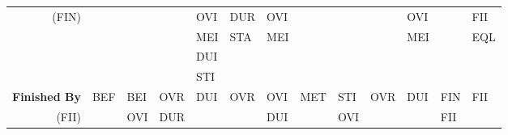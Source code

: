 \documentclass[11pt]{report}
\newenvironment{vvarmargin}[2]
{
  \begin{list}{}
  {
    \setlength{\topsep}{0pt}
    \setlength{\leftmargin}{0pt}
    \setlength{\rightmargin}{0pt}
    \setlength{\listparindent}{\parindent}
    \setlength{\itemindent}{\parindent}
    \setlength{\parsep}{0pt plus 1pt}
    \addtolength{\leftmargin}{#1}\addtolength{\rightmargin}{#2}
  }
  \item
}
{
  \end{list}
}
\begin{document}
\begin{table}[p]
\begin{vvarmargin}{-4cm}{-4cm}
\begin{center}
\begin{tabular}[t]{|r|l|l|l|l|l|l|l|l|l|l|l|l|}
                (FIN)                   &                         &                         &                         & OVI                     & DUR                     & OVI                     &                         &                         &                         & OVI                     &                         & FII                     \\
                                        &                         &                         &                         & MEI                     & STA                     & MEI                     &                         &                         &                         & MEI                     &                         & EQL                     \\
                                        &                         &                         &                         & DUI                     &                         &                         &                         &                         &                         &                         &                         &                         \\
                                        &                         &                         &                         & STI                     &                         &                         &                         &                         &                         &                         &                         &                         \\
                \hline                                                                                                                                                                                                                                                                                                                                          
                \textbf{Finished By}    & BEF                     & BEI                     & OVR                     & DUI                     & OVR                     & OVI                     & MET                     & STI                     & OVR                     & DUI                     & FIN                     & FII                     \\
                (FII)                   &                         & OVI                     & DUR                     &                         &                         & DUI                     &                         & OVI                     &                         &                         & FII                     &                         \\

\end{tabular}
\end{center}
\end{vvarmargin}
\end{table}
\end{document}
